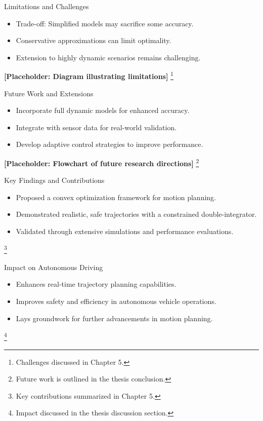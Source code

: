 \documentclass[shortpres,aspectratio=43]{beamer}
\newcommand\blfootnote[1]{%
  \begingroup
  \renewcommand\thefootnote{}\footnote{#1}%
  \addtocounter{footnote}{-1}%
  \endgroup
}
\begin{document}
\begin{frame}{Limitations and Challenges}
  \begin{itemize}
    \item Trade-off: Simplified models may sacrifice some accuracy.
    \item Conservative approximations can limit optimality.
    \item Extension to highly dynamic scenarios remains challenging.
  \end{itemize}
  \centering
  \textbf{[Placeholder: Diagram illustrating limitations]}
  \blfootnote{\tiny Challenges discussed in Chapter 5.}
\end{frame}

\begin{frame}{Future Work and Extensions}
  \begin{itemize}
    \item Incorporate full dynamic models for enhanced accuracy.
    \item Integrate with sensor data for real-world validation.
    \item Develop adaptive control strategies to improve performance.
  \end{itemize}
  \centering
  \textbf{[Placeholder: Flowchart of future research directions]}
  \blfootnote{\tiny Future work is outlined in the thesis conclusion.}
\end{frame}

\begin{frame}{Key Findings and Contributions}
  \begin{itemize}
    \item Proposed a convex optimization framework for motion planning.
    \item Demonstrated realistic, safe trajectories with a constrained double-integrator.
    \item Validated through extensive simulations and performance evaluations.
  \end{itemize}
  \blfootnote{\tiny Key contributions summarized in Chapter 5.}
\end{frame}

\begin{frame}{Impact on Autonomous Driving}
  \begin{itemize}
    \item Enhances real-time trajectory planning capabilities.
    \item Improves safety and efficiency in autonomous vehicle operations.
    \item Lays groundwork for further advancements in motion planning.
  \end{itemize}
  \blfootnote{\tiny Impact discussed in the thesis discussion section.}
\end{frame}
\end{document}
